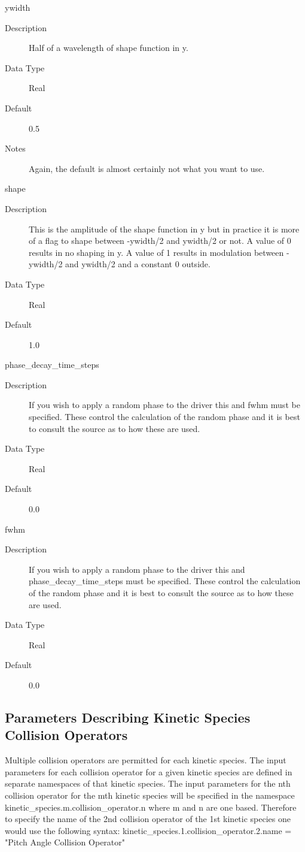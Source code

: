 \documentclass[11pt]{amsart}
\begin{document}
ywidth
\begin{description}
\item [Description] Half of a wavelength of shape function in y.
\item [Data Type] Real
\item [Default] 0.5
\item [Notes] Again, the default is almost certainly not what you want to use.
\end{description}

shape
\begin{description}
\item [Description] This is the amplitude of the shape function in y but in
practice it is more of a flag to shape between -ywidth/2 and ywidth/2 or
not.  A value of 0 results in no shaping in y.  A value of 1 results in
modulation between -ywidth/2 and ywidth/2 and a constant 0 outside.
\item [Data Type] Real
\item [Default] 1.0
\end{description}

phase\_decay\_time\_steps
\begin{description}
\item [Description] If you wish to apply a random phase to the driver this and
fwhm must be specified.  These control the calculation of the random phase
and it is best to consult the source as to how these are used.
\item [Data Type] Real
\item [Default] 0.0
\end{description}

fwhm
\begin{description}
\item [Description] If you wish to apply a random phase to the driver this and \\
phase\_decay\_time\_steps must be specified.  These control the calculation
of the random phase and it is best to consult the source as to how these are
used.
\item [Data Type] Real
\item [Default] 0.0
\end{description}

\subsection*{Parameters Describing Kinetic Species Collision Operators}
Multiple collision operators are permitted for each kinetic species.  The input
parameters for each collision operator for a given kinetic species are defined
in separate namespaces of that kinetic species.  The input parameters for the
nth collision operator for the mth kinetic species will be specified in the
namespace kinetic\_species.m.collision\_operator.n where m and n are one based.
Therefore to specify the name of the 2nd collision operator of the 1st kinetic
species one would use the following syntax:
kinetic\_species.1.collision\_operator.2.name = "Pitch Angle Collision Operator"
\end{document}
